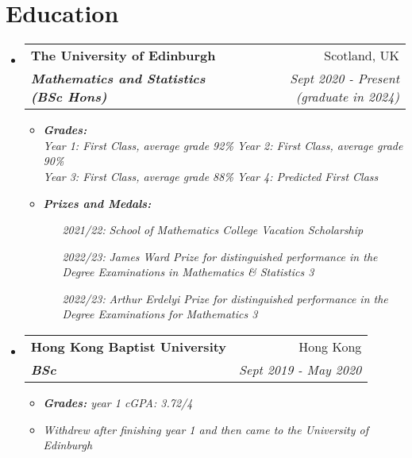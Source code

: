 \documentclass[12pt, a4paper]{article}
\makeatletter
\newcommand{\resumeSection}[1]{
    \section*{#1}
}
\newcommand{\resumeSectionItm}[4]{
\item
    \begin{tabular*}{0.96\textwidth}{@{}l@{\extracolsep{\fill}}r@{}}
        \textbf{#1} & #2 \\
        \textit{\textbf{#3}} & \textit{#4}
    \end{tabular*}
}
\makeatother
\begin{document}
\resumeSection{Education}
\begin{itemize}[leftmargin=*]
    \resumeSectionItm
    {The University of Edinburgh}{Scotland, UK}
    {Mathematics and Statistics (BSc Hons)}{Sept 2020 - Present
    (graduate in 2024)}
    \begin{itemize}[leftmargin=*]
        \item \it{\textbf{Grades:}}\\
            \it{\footnotesize Year 1: First Class, average grade 92\%}
            \hspace{5mm}\it{\footnotesize Year 2: First Class, average grade 90\%}\\
            \it{\footnotesize Year 3: First Class, average grade 88\%}
            \hspace{5mm}\it{\footnotesize Year 4: Predicted First Class}
        \item \it{\textbf{Prizes and Medals:}}
            \begin{itemize}[
                align=left,
                leftmargin=4em,
                itemindent=0.5pt,
                labelsep=0pt,
                labelwidth=4em
                ]
                \item [\it{2021/22:}]
                    \it{School of Mathematics College Vacation Scholarship}
                \item [\it{2022/23:}]
                    \it{James Ward Prize for distinguished performance in the
                        Degree Examinations in Mathematics \& Statistics 3}
                \item [\it{2022/23:}]
                    \it{Arthur Erdelyi Prize for distinguished
                    performance in the Degree Examinations for Mathematics 3}
            \end{itemize}
    \end{itemize}
\end{itemize}
\vspace{-5mm}
\begin{itemize}[leftmargin=*]
    \resumeSectionItm
    {Hong Kong Baptist University}{Hong Kong}
    {BSc}{Sept 2019 - May 2020}
    \vspace{-1.5mm}
    \begin{itemize}[leftmargin=*]
        \item \it{\textbf{Grades:}}
            \textit{\footnotesize year 1 cGPA: 3.72/4}
        \item \textit{\footnotesize Withdrew after finishing year 1 and then
                came to the University of Edinburgh}
    \end{itemize}
\end{itemize}
\vspace{-4mm}
\end{document}
